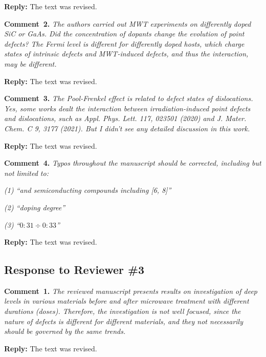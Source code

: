 \documentclass[10pt]{iopart}
\begin{document}
\noindent
\textcolor[rgb]{0.51,0.00,0.00}{\textbf{Reply:}}
The text was revised.


\vspace{1cm}
\noindent
\textcolor[rgb]{0.00,0.50,1.00}{\textbf{Comment~2.}}
\emph{The authors carried out MWT experiments on differently doped SiC or GaAs.
Did the concentration of dopants change the evolution of point defects?
The Fermi level is different for differently doped hosts,
which charge states of intrinsic defects and MWT-induced defects, and thus the interaction, may be different.}

\noindent
\textcolor[rgb]{0.51,0.00,0.00}{\textbf{Reply:}}
The text was revised.


\vspace{1cm}
\noindent
\textcolor[rgb]{0.00,0.50,1.00}{\textbf{Comment~3.}}
\emph{The Pool-Frenkel effect is related to defect states of dislocations.
Yes, some works dealt the interaction between irradiation-induced point defects and dislocations,
such as Appl. Phys. Lett. 117, 023501 (2020) and J. Mater. Chem. C 9, 3177 (2021).
But I didn’t see any detailed discussion in this work.}

\noindent
\textcolor[rgb]{0.51,0.00,0.00}{\textbf{Reply:}}
The text was revised.


\vspace{1cm}
\noindent
\textcolor[rgb]{0.00,0.50,1.00}{\textbf{Comment~4.}}
\emph{Typos throughout the manuscript should be corrected, including but not limited to:}

\emph{(1) ``and semiconducting compounds including [6, 8]''}

\emph{(2) ``doping degree''}

\emph{(3) ``$0:31\div0:33$''}

\noindent
\textcolor[rgb]{0.51,0.00,0.00}{\textbf{Reply:}}
The text was revised.


\subsection*{Response to Reviewer \#3 }
\noindent
\textcolor[rgb]{0.00,0.50,1.00}{\textbf{Comment~1.}}
\emph{The reviewed manuscript presents results on investigation of deep levels
in various materials before and after microwave treatment with different durations (doses).
Therefore, the investigation is not well focused, since the nature of defects is different
for different materials, and they not necessarily should be governed by the same trends. }

\noindent
\textcolor[rgb]{0.51,0.00,0.00}{\textbf{Reply:}}
The text was revised.
\end{document}
